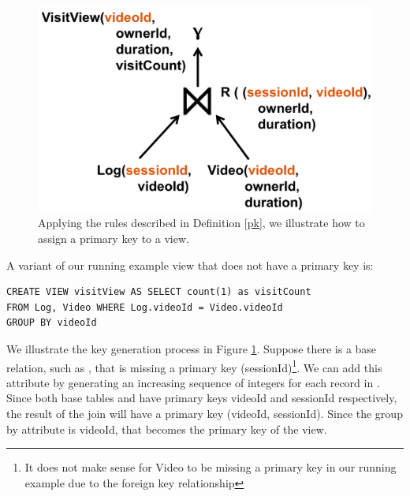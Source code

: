 
\begin{figure}[t] \vspace{-2em}
\centering
 \includegraphics[scale=0.20]{figs/primary_key.png} \vspace{-.5em}
 \caption{Applying the rules described in Definition \ref{pk}, we illustrate how to assign a primary key to a view.  \label{pk-fig}}\vspace{-1.5em}
\end{figure}

\begin{example}
A variant of our running example view that does not have a primary key is:
\begin{lstlisting}[mathescape,basicstyle={\scriptsize}]
CREATE VIEW visitView AS SELECT count(1) as visitCount
FROM Log, Video WHERE Log.videoId = Video.videoId
GROUP BY videoId
\end{lstlisting}
We illustrate the key generation process in Figure \ref{pk-fig}.
Suppose there is a base relation, such as , that is missing a primary key (sessionId)\footnote{\scriptsize It does not make sense for Video to be missing a primary key in our running example due to the foreign key relationship}.
We can add this attribute by generating an increasing sequence of integers for each record in . 
Since both base tables  and  have primary keys videoId and sessionId respectively,
the result of the join will have a primary key (videoId, sessionId).
Since the group by attribute is videoId, that becomes the primary key of the view.
\end{example}

